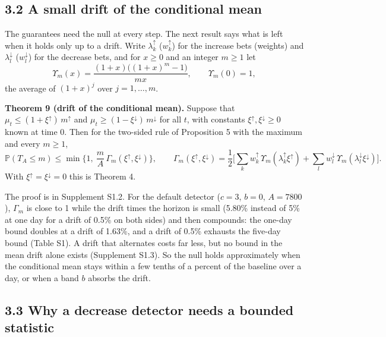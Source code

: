 \documentclass[
]{article}
\begin{document}
\hypertarget{a-small-drift-of-the-conditional-mean}{%
\subsection{3.2 A small drift of the conditional
mean}\label{a-small-drift-of-the-conditional-mean}}

The guarantees need the null at every step. The next result says what is
left when it holds only up to a drift. Write \(\lambda_k^{\uparrow}\)
(\(w_k^{\uparrow}\)) for the increase bets (weights) and
\(\lambda_l^{\downarrow}\) (\(w_l^{\downarrow}\)) for the decrease bets,
and for \(x \ge 0\) and an integer \(m \ge 1\) let \[
\Upsilon_m(x) = \frac{(1 + x)\big((1 + x)^m - 1\big)}{m x}, \qquad \Upsilon_m(0) = 1,
\] the average of \((1+x)^j\) over \(j = 1, \dots, m\).

\textbf{Theorem 9 (drift of the conditional mean).} Suppose that
\(\mu_t \le (1 + \xi^{\uparrow})\,m^{\uparrow}\) and
\(\mu_t \ge (1 - \xi^{\downarrow})\,m^{\downarrow}\) for all \(t\), with
constants \(\xi^{\uparrow}, \xi^{\downarrow} \ge 0\) known at time 0.
Then for the two-sided rule of Proposition 5 with the maximum and every
\(m \ge 1\), \[
\mathbb{P}(T_A \le m) \le \min\Big\lbrace 1,\ \frac{m}{A}\,\Gamma_m(\xi^{\uparrow}, \xi^{\downarrow}) \Big\rbrace, \qquad
\Gamma_m(\xi^{\uparrow}, \xi^{\downarrow}) = \frac12\Big[\sum_k w_k^{\uparrow}\,\Upsilon_m(\lambda_k^{\uparrow}\xi^{\uparrow}) + \sum_l w_l^{\downarrow}\,\Upsilon_m(\lambda_l^{\downarrow}\xi^{\downarrow})\Big].
\] With \(\xi^{\uparrow} = \xi^{\downarrow} = 0\) this is Theorem 4.

The proof is in Supplement S1.2. For the default detector (\(c = 3\),
\(b = 0\), \(A = 7800\)), \(\Gamma_m\) is close to 1 while the drift
times the horizon is small (5.80\% instead of 5\% at one day for a drift
of 0.5\% on both sides) and then compounds: the one-day bound doubles at
a drift of 1.63\%, and a drift of 0.5\% exhausts the five-day bound
(Table S1). A drift that alternates costs far less, but no bound in the
mean drift alone exists (Supplement S1.3). So the null holds
approximately when the conditional mean stays within a few tenths of a
percent of the baseline over a day, or when a band \(b\) absorbs the
drift.

\hypertarget{why-a-decrease-detector-needs-a-bounded-statistic}{%
\subsection{3.3 Why a decrease detector needs a bounded
statistic}\label{why-a-decrease-detector-needs-a-bounded-statistic}}
\end{document}
